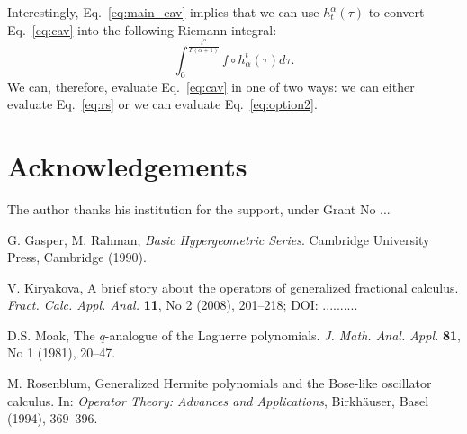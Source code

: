 \documentclass[twoside,reqno,11pt]{fcaa-var} %
\begin{document}
\noindent
Interestingly, Eq.~\eqref{eq:main_cav} implies that we can use $h_t^{\alpha}(\tau)$ to convert Eq.~\eqref{eq:cav} into the following Riemann integral:
\begin{equation}
\label{eq:option2}
\int_0^{\frac{t^{\alpha}}{\Gamma(\alpha+1)}} f\circ h_{\alpha}^t (\tau) d\tau.  
\end{equation}
We can, therefore, evaluate Eq.~\eqref{eq:cav} in one of two ways: we can either evaluate Eq.~\eqref{eq:rs} or we can evaluate Eq.~\eqref{eq:option2}.


 
\section*{Acknowledgements}

 The author thanks his institution for the support, under Grant No ...


 \begin{thebibliography}{99}
 \normalsize


 G. Gasper, M. Rahman,
 \emph{Basic Hypergeometric Series}.
 Cambridge University Press, Cambridge (1990).


 V. Kiryakova,
 A brief story about the operators of generalized
fractional calculus.
 \emph{Fract. Calc. Appl. Anal.} \textbf{11}, No 2 (2008), 201--218; DOI: ..........


 D.S. Moak,
 The $q$-analogue of the Laguerre polynomials.
\emph{J. Math. Anal. Appl.} \textbf{81}, No 1 (1981), 20--47. %


 M. Rosenblum,
 Generalized Hermite polynomials and the Bose-like oscillator
 calculus.
 In: \emph{Operator Theory: Advances and Applications},
 Birkh\"auser, Basel (1994), 369--396.

\end{thebibliography} %
\end{document}
